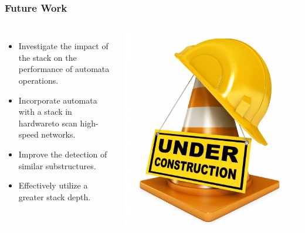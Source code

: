 \begin{frame}
  \frametitle{Future Work}
  \begin{columns}
    \vspace*{2em}
    \begin{itemize}
      \item Investigate the impact of the stack on the performance of automata operations.\justifying
      \item Incorporate automata with a stack in hardware\break to scan high-speed networks.\justifying
      \item Improve the detection of similar substructures.\justifying
      \item Effectively utilize a greater stack depth.\justifying
    \end{itemize}

    \vspace*{3.5em}

    \includegraphics[width=1\textwidth]{img/todo2.jpg}
    \vspace*{-11em}
  \end{columns}
\end{frame}

